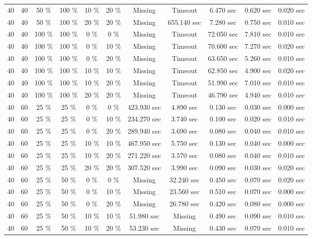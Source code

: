 \documentclass{article}
\begin{document}
\begin{longtable}[]{@{}ccccccccccc@{}}
40 & 40 & 50 \% & 100 \% & 10 \% & 20 \% & Missing & Timeout & 6.470 sec & 0.620 sec & 0.020 sec \\
40 & 40 & 50 \% & 100 \% & 20 \% & 20 \% & Missing & 655.140 sec & 7.280 sec & 0.750 sec & 0.010 sec \\
40 & 40 & 100 \% & 100 \% & 0 \% & 0 \% & Missing & Timeout & 72.050 sec & 7.810 sec & 0.010 sec \\
40 & 40 & 100 \% & 100 \% & 0 \% & 10 \% & Missing & Timeout & 70.600 sec & 7.270 sec & 0.020 sec \\
40 & 40 & 100 \% & 100 \% & 0 \% & 20 \% & Missing & Timeout & 63.650 sec & 5.260 sec & 0.010 sec \\
40 & 40 & 100 \% & 100 \% & 10 \% & 10 \% & Missing & Timeout & 62.850 sec & 4.900 sec & 0.020 sec \\
40 & 40 & 100 \% & 100 \% & 10 \% & 20 \% & Missing & Timeout & 51.990 sec & 7.010 sec & 0.010 sec \\
40 & 40 & 100 \% & 100 \% & 20 \% & 20 \% & Missing & Timeout & 46.790 sec & 4.940 sec & 0.010 sec \\
40 & 60 & 25 \% & 25 \% & 0 \% & 0 \% & 423.930 sec & 4.890 sec & 0.130 sec & 0.030 sec & 0.000 sec \\
40 & 60 & 25 \% & 25 \% & 0 \% & 10 \% & 234.270 sec & 3.740 sec & 0.100 sec & 0.020 sec & 0.010 sec \\
40 & 60 & 25 \% & 25 \% & 0 \% & 20 \% & 289.940 sec & 3.690 sec & 0.080 sec & 0.040 sec & 0.010 sec \\
40 & 60 & 25 \% & 25 \% & 10 \% & 10 \% & 467.950 sec & 5.750 sec & 0.130 sec & 0.040 sec & 0.000 sec \\
40 & 60 & 25 \% & 25 \% & 10 \% & 20 \% & 271.220 sec & 3.570 sec & 0.080 sec & 0.040 sec & 0.010 sec \\
40 & 60 & 25 \% & 25 \% & 20 \% & 20 \% & 307.520 sec & 3.990 sec & 0.090 sec & 0.030 sec & 0.020 sec \\
40 & 60 & 25 \% & 50 \% & 0 \% & 0 \% & Missing & 32.240 sec & 0.450 sec & 0.070 sec & 0.020 sec \\
40 & 60 & 25 \% & 50 \% & 0 \% & 10 \% & Missing & 23.560 sec & 0.510 sec & 0.070 sec & 0.000 sec \\
40 & 60 & 25 \% & 50 \% & 0 \% & 20 \% & Missing & 26.780 sec & 0.420 sec & 0.080 sec & 0.000 sec \\
40 & 60 & 25 \% & 50 \% & 10 \% & 10 \% & 51.980 sec & Missing & 0.490 sec & 0.090 sec & 0.010 sec \\
40 & 60 & 25 \% & 50 \% & 10 \% & 20 \% & 53.230 sec & Missing & 0.430 sec & 0.070 sec & 0.010 sec \\

\end{longtable}
\end{document}
